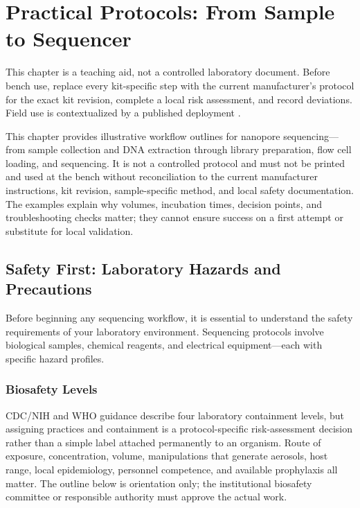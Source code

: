\chapter{Practical Protocols: From Sample to Sequencer}
\label{ch:protocols}

\begin{sourcebox}
This chapter is a teaching aid, not a controlled laboratory document. Before bench use, replace every kit-specific step with the current manufacturer's protocol for the exact kit revision, complete a local risk assessment, and record deviations. Field use is contextualized by a published deployment \cite{quick2016}.
\end{sourcebox}

\begin{keyconcept}
This chapter provides illustrative workflow outlines for nanopore sequencing---from sample collection and DNA extraction through library preparation, flow cell loading, and sequencing. It is not a controlled protocol and must not be printed and used at the bench without reconciliation to the current manufacturer instructions, kit revision, sample-specific method, and local safety documentation. The examples explain why volumes, incubation times, decision points, and troubleshooting checks matter; they cannot ensure success on a first attempt or substitute for local validation.
\end{keyconcept}

\section{Safety First: Laboratory Hazards and Precautions}
\label{sec:protocols:safety}

Before beginning any sequencing workflow, it is essential to understand the safety requirements of your laboratory environment. Sequencing protocols involve biological samples, chemical reagents, and electrical equipment---each with specific hazard profiles.

\subsection{Biosafety Levels}
\label{subsec:protocols:bsl}

CDC/NIH and WHO guidance describe four laboratory containment levels, but assigning practices and containment is a protocol-specific risk-assessment decision rather than a simple label attached permanently to an organism. Route of exposure, concentration, volume, manipulations that generate aerosols, host range, local epidemiology, personnel competence, and available prophylaxis all matter. The outline below is orientation only; the institutional biosafety committee or responsible authority must approve the actual work.

